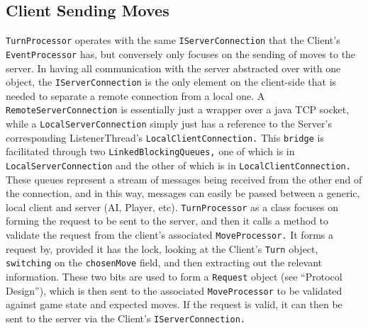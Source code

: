 \documentclass[a4paper,doc]{apa6}
\newcommand{\code}{\texttt}
\begin{document}
\subsection{Client Sending Moves}
\code{TurnProcessor} operates with the same \code{IServerConnection} that the Client’s \code{EventProcessor} has, but conversely only focuses on the sending of moves to the server. In having all communication with the server abstracted over with one object, the \code{IServerConnection} is the only element on the client-side that is needed to separate a remote connection from a local one. A \code{RemoteServerConnection} is essentially just a wrapper over a java TCP socket, while a \code{LocalServerConnection} simply just has a reference to the Server’s corresponding ListenerThread’s \code{LocalClientConnection.} This \code{bridge} is facilitated through two \code{LinkedBlockingQueues,} one of which is in \code{LocalServerConnection} and the other of which is in \code{LocalClientConnection.} These queues represent a stream of messages being received from the other end of the connection, and in this way, messages can easily be passed between a generic, local client and server (AI, Player, etc). \code{TurnProcessor} as a class focuses on forming the request to be sent to the server, and then it calls a method to validate the request from the client’s associated \code{MoveProcessor.} It forms a request by, provided it has the lock, looking at the Client’s \code{Turn} object, \code{switching} on the \code{chosenMove} field, and then extracting out the relevant information. These two bits are used to form a \code{Request} object (see  “Protocol Design”), which is then sent to the associated \code{MoveProcessor} to be validated against game state and expected moves. If the request is valid, it can then be sent to the server via the Client’s \code{IServerConnection.}
\end{document}

